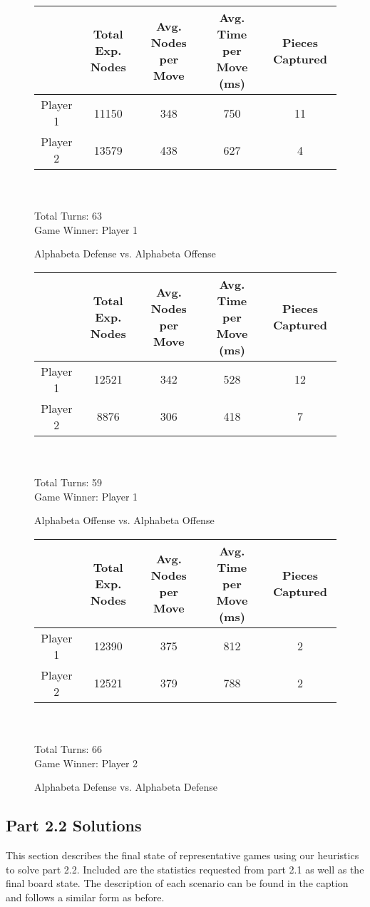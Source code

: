 \documentclass{article}
\begin{document}
\begin{figure}[H]
\begin{tabular}{|c|c|c|c|c|}
\hline 
 & Total Exp. Nodes & Avg. Nodes per Move & Avg. Time per Move (ms) & Pieces Captured \\
\hline
 Player 1 & 11150 & 348 & 750 & 11 \\
\hline
 Player 2 & 13579 & 438 & 627 & 4 \\
\hline
\end{tabular}\\\\
Total Turns: 63\\
Game Winner: Player 1
\caption{Alphabeta Defense vs. Alphabeta Offense}
\end{figure}

\begin{figure}[H]
\begin{tabular}{|c|c|c|c|c|}
\hline 
 & Total Exp. Nodes & Avg. Nodes per Move & Avg. Time per Move (ms) & Pieces Captured \\
\hline
 Player 1 & 12521 & 342 & 528 & 12 \\
\hline
 Player 2 & 8876 & 306 & 418 & 7 \\
\hline
\end{tabular}\\\\
Total Turns: 59\\
Game Winner: Player 1
\caption{Alphabeta Offense vs. Alphabeta Offense}
\end{figure}

\begin{figure}[H]
\begin{tabular}{|c|c|c|c|c|}
\hline 
 & Total Exp. Nodes & Avg. Nodes per Move & Avg. Time per Move (ms) & Pieces Captured \\
\hline
 Player 1 & 12390 & 375 & 812 & 2 \\
\hline
 Player 2 & 12521 & 379 & 788 & 2 \\
\hline
\end{tabular}\\\\
Total Turns: 66\\
Game Winner: Player 2
\caption{Alphabeta Defense vs. Alphabeta Defense}
\end{figure}

\subsection{Part 2.2 Solutions}
This section describes the final state of representative games using our heuristics to solve part 2.2. Included are the statistics requested from part 2.1 as well as the final board state. The description of each scenario can be found in the caption and follows a similar form as before.
\end{document}
